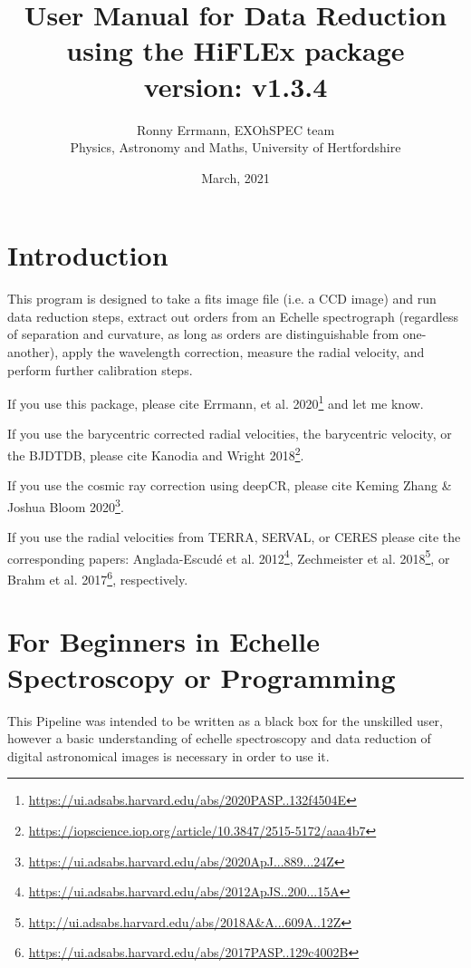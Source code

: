 \documentclass[10pt,a4paper]{article}
\title{User Manual for Data Reduction using the HiFLEx package\\ version: v1.3.4}
\date{March, 2021}
\author{Ronny Errmann, EXOhSPEC team\\ Physics, Astronomy and Maths, University of Hertfordshire}
\begin{document}
\maketitle

\tableofcontents
{}


\newpage


\section{Introduction}
\label{intro}

This program is designed to take a fits image file (i.e. a CCD image) and run data reduction steps, extract out orders from an Echelle spectrograph (regardless of separation and curvature, as long as orders are distinguishable from one-another), apply the wavelength correction, measure the radial velocity, and perform further calibration steps.

If you use this package, please cite Errmann, et al. 2020\footnote{\url{https://ui.adsabs.harvard.edu/abs/2020PASP..132f4504E}} and let me know.

If you use the barycentric corrected radial velocities, the barycentric velocity, or the BJDTDB, please cite Kanodia and Wright 2018\footnote{\url{https://iopscience.iop.org/article/10.3847/2515-5172/aaa4b7}}.

If you use the cosmic ray correction using deepCR, please cite Keming Zhang \& Joshua Bloom 2020\footnote{\url{https://ui.adsabs.harvard.edu/abs/2020ApJ...889...24Z}}.

If you use the radial velocities from TERRA, SERVAL, or CERES please cite the corresponding papers: Anglada-Escud{\'e} et al. 2012\footnote{\url{https://ui.adsabs.harvard.edu/abs/2012ApJS..200...15A}}, Zechmeister et al. 2018\footnote{\url{http://ui.adsabs.harvard.edu/abs/2018A&A...609A..12Z}}, or 
Brahm et al. 2017\footnote{\url{https://ui.adsabs.harvard.edu/abs/2017PASP..129c4002B}}, respectively.


\section{For Beginners in Echelle Spectroscopy or Programming}

This Pipeline was intended to be written as a black box for the unskilled user, however a basic understanding of echelle spectroscopy and data reduction of digital astronomical images is necessary in order to use it.
\end{document}
